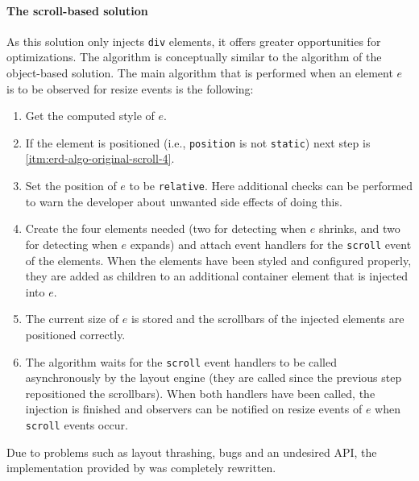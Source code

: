 \documentclass[a4paper,11pt]{kth-mag}
\newcommand{\code}[1]{\texttt{#1}}
\begin{document}
        \paragraph{The scroll-based solution}
        As this solution only injects \code{div} \glspl{element}, it offers greater opportunities for optimizations.
        The algorithm is conceptually similar to the algorithm of the object-based solution.
        The main algorithm that is performed when an element $e$ is to be observed for resize events is the following:
        \begin{enumerate}
          \item\label{itm:erd-algo-original-scroll-1} Get the computed style of $e$.
          \item\label{itm:erd-algo-original-scroll-2} If the element is positioned (i.e., \code{position} is not \code{static}) next step is \ref{itm:erd-algo-original-scroll-4}.
          \item\label{itm:erd-algo-original-scroll-3} Set the position of $e$ to be \code{relative}. Here additional checks can be performed to warn the developer about unwanted side effects of doing this.
          \item\label{itm:erd-algo-original-scroll-4} Create the four \glspl{element} needed (two for detecting when $e$ shrinks, and two for detecting when $e$ expands) and attach event handlers for the \code{scroll} event of the \glspl{element}.
                                                      When the \glspl{element} have been styled and configured properly, they are added as children to an additional container element that is injected into $e$.
          \item\label{itm:erd-algo-original-scroll-5} The current size of $e$ is stored and the scrollbars of the injected \glspl{element} are positioned correctly.
          \item\label{itm:erd-algo-original-scroll-6} The algorithm waits for the \code{scroll} event handlers to be called asynchronously by the \gls{layout engine} (they are called since the previous step repositioned the scrollbars).
                                                      When both handlers have been called, the injection is finished and observers can be notified on resize events of $e$ when \code{scroll} events occur.
        \end{enumerate}
        Due to problems such as \gls{layout thrashing}, bugs and an undesired \gls{API}, the implementation provided by \cite{eq_imp_css-element-queries} was completely rewritten.
\end{document}
